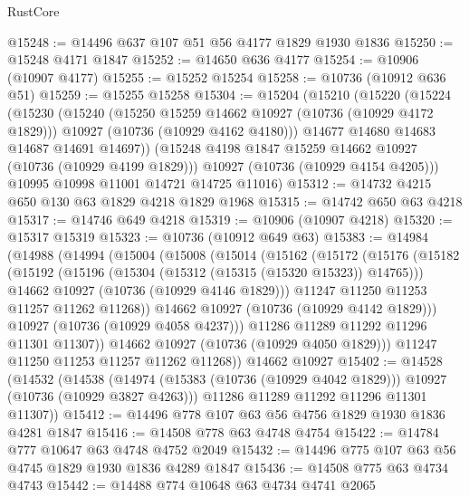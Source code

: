 \begin{lexlean}{RustCore}
\begin{coremodule}
@15248 := @14496 @637 @107 @51 @56 @4177 @1829 @1930 @1836
@15250 := @15248 @4171 @1847
@15252 := @14650 @636 @4177
@15254 := @10906 (@10907 @4177)
@15255 := @15252 @15254
@15258 := @10736 (@10912 @636 @51)
@15259 := @15255 @15258
@15304 := @15204
    (@15210
      (@15220
        (@15224
          (@15230
            (@15240
              (@15250 @15259 @14662 @10927 (@10736 (@10929 @4172 @1829)))
              @10927
              (@10736 (@10929 @4162 @4180)))
            @14677
            @14680
            @14683
            @14687
            @14691
            @14697))
        (@15248 @4198 @1847 @15259 @14662 @10927 (@10736 (@10929 @4199 @1829)))
        @10927
        (@10736 (@10929 @4154 @4205)))
      @10995
      @10998
      @11001
      @14721
      @14725
      @11016)
@15312 := @14732 @4215 @650 @130 @63 @1829 @4218 @1829 @1968
@15315 := @14742 @650 @63 @4218
@15317 := @14746 @649 @4218
@15319 := @10906 (@10907 @4218)
@15320 := @15317 @15319
@15323 := @10736 (@10912 @649 @63)
@15383 := @14984
    (@14988
      (@14994
        (@15004
          (@15008
            (@15014
              (@15162
                (@15172
                  (@15176
                    (@15182
                      (@15192
                        (@15196 (@15304 (@15312 (@15315 (@15320 @15323)) @14765)))
                        @14662
                        @10927
                        (@10736 (@10929 @4146 @1829)))
                      @11247
                      @11250
                      @11253
                      @11257
                      @11262
                      @11268))
                  @14662
                  @10927
                  (@10736 (@10929 @4142 @1829)))
                @10927
                (@10736 (@10929 @4058 @4237)))
              @11286
              @11289
              @11292
              @11296
              @11301
              @11307))
          @14662
          @10927
          (@10736 (@10929 @4050 @1829)))
        @11247
        @11250
        @11253
        @11257
        @11262
        @11268))
    @14662
    @10927
@15402 := @14528
    (@14532
      (@14538
        (@14974 (@15383 (@10736 (@10929 @4042 @1829))) @10927 (@10736 (@10929 @3827 @4263)))
        @11286
        @11289
        @11292
        @11296
        @11301
        @11307))
@15412 := @14496 @778 @107 @63 @56 @4756 @1829 @1930 @1836 @4281 @1847
@15416 := @14508 @778 @63 @4748 @4754
@15422 := @14784 @777 @10647 @63 @4748 @4752 @2049
@15432 := @14496 @775 @107 @63 @56 @4745 @1829 @1930 @1836 @4289 @1847
@15436 := @14508 @775 @63 @4734 @4743
@15442 := @14488 @774 @10648 @63 @4734 @4741 @2065

\end{coremodule}
\end{lexlean}
